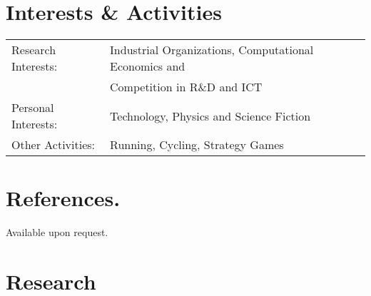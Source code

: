 \documentclass[a4paper,10pt]{article} %
\begin{document}
\section{Interests \& Activities}
\begin{tabular}{ll}
	Research Interests: & Industrial Organizations, Computational Economics and \\
						& Competition in R\&D and ICT\\
	Personal Interests: & Technology, Physics and Science Fiction\\
	Other Activities:   & Running, Cycling, Strategy Games
\end{tabular}

\section{References.}
Available upon request.


\newpage
\newpage
\section{Research}
\end{document}
